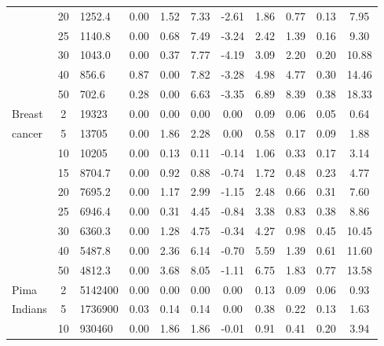 {\begin{longtable}{@{}lclcccccccc@{}}
                      & 20 & 1252.4          & 0.00    & 1.52  & 7.33  & -2.61 & 1.86    & 0.77 & 0.13 & 7.95  \\
                      & 25 & 1140.8          & 0.00    & 0.68  & 7.49  & -3.24 & 2.42    & 1.39 & 0.16 & 9.30  \\
                      & 30 & 1043.0          & 0.00    & 0.37  & 7.77  & -4.19 & 3.09    & 2.20 & 0.20 & 10.88 \\
                      & 40 & 856.6           & 0.87    & 0.00  & 7.82  & -3.28 & 4.98    & 4.77 & 0.30 & 14.46 \\
                      & 50 & 702.6           & 0.28    & 0.00  & 6.63  & -3.35 & 6.89    & 8.39 & 0.38 & 18.33 \\ \hline
Breast                & 2  & 19323           & 0.00    & 0.00  & 0.00  & 0.00  & 0.09    & 0.06 & 0.05 & 0.64  \\
cancer                & 5  & 13705           & 0.00    & 1.86  & 2.28  & 0.00  & 0.58    & 0.17 & 0.09 & 1.88  \\
                      & 10 & 10205           & 0.00    & 0.13  & 0.11  & -0.14 & 1.06    & 0.33 & 0.17 & 3.14  \\
                      & 15 & 8704.7          & 0.00    & 0.92  & 0.88  & -0.74 & 1.72    & 0.48 & 0.23 & 4.77  \\
                      & 20 & 7695.2          & 0.00    & 1.17  & 2.99  & -1.15 & 2.48    & 0.66 & 0.31 & 7.60  \\
                      & 25 & 6946.4          & 0.00    & 0.31  & 4.45  & -0.84 & 3.38    & 0.83 & 0.38 & 8.86  \\
                      & 30 & 6360.3          & 0.00    & 1.28  & 4.75  & -0.34 & 4.27    & 0.98 & 0.45 & 10.45 \\
                      & 40 & 5487.8          & 0.00    & 2.36  & 6.14  & -0.70 & 5.59    & 1.39 & 0.61 & 11.60 \\
                      & 50 & 4812.3          & 0.00    & 3.68  & 8.05  & -1.11 & 6.75    & 1.83 & 0.77 & 13.58 \\ \hline
Pima                  & 2  & 5142400         & 0.00    & 0.00  & 0.00  & 0.00  & 0.13    & 0.09 & 0.06 & 0.93  \\
Indians               & 5  & 1736900         & 0.03    & 0.14  & 0.14  & 0.00  & 0.38    & 0.22 & 0.13 & 1.63  \\
                      & 10 & 930460          & 0.00    & 1.86  & 1.86  & -0.01 & 0.91    & 0.41 & 0.20 & 3.94  \\

\end{longtable}}
